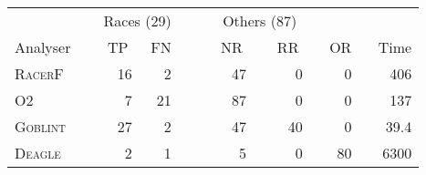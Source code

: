 \begin{tabular}{@{}lrrcrrrr@{}}
\toprule
& \multicolumn{2}{c}{Races (29)} & & \multicolumn{2}{c}{Others (87)}\\

\cmidrule{2-3} \cmidrule{5-6}
Analyser$\hspace{15pt}$ & $\;$TP$\;$ & $\;$FN & $\;\;\;\;$ & $\;$NR$\;$ & $\;\;\;\;$RR$\;$ & $\;\;\;$OR & $\;\;\;$Time \\
\midrule
\rowcolor{GreenYellow}
\textsc{RacerF} & 16 & 2 & & 47 & 0 & 0 & 406 \\
\textsc{O2} & 7 & 21 & & 87 & 0 & 0 & 137 \\
\rowcolor[gray]{0.9}
\textsc{Goblint} & 27 & 2 & & 47 & 40 & 0 & 39.4 \\
\textsc{Deagle} & 2 & 1 & & 5 & 0 & 80 & 6300\\

\bottomrule
\end{tabular}